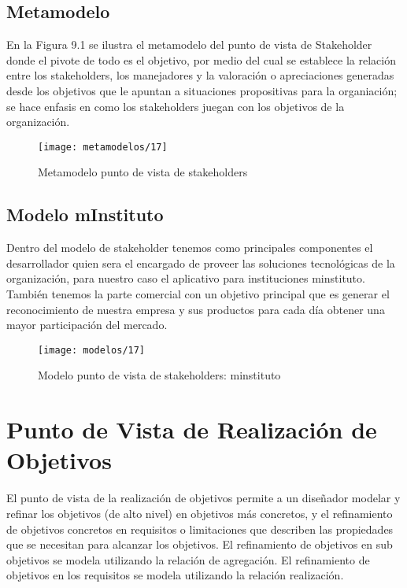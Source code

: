    \subsection{Metamodelo}
   En la Figura 9.1 se ilustra el metamodelo del punto de vista de Stakeholder donde el pivote de todo es el objetivo, por medio del cual se establece la relación entre los stakeholders, los manejadores y la valoración o apreciaciones generadas desde los objetivos que le apuntan a situaciones propositivas para la organiación; se hace enfasis en como los stakeholders juegan con los objetivos de la organización.
   
   \begin{figure}[H]
   	\centering
   	\texttt{[image: metamodelos/17]}
   	\captionsetup{width=.95\textwidth}
   	\caption{Metamodelo punto de vista de stakeholders}
   	\label{metamodelo17}
   \end{figure}
   
   \subsection{Modelo mInstituto}
   Dentro del modelo de stakeholder tenemos como principales componentes el desarrollador quien sera el encargado de proveer las soluciones tecnológicas de la organización, para nuestro caso el aplicativo para instituciones minstituto. También tenemos la parte comercial con un objetivo principal que es generar el reconocimiento de nuestra empresa y sus productos para cada día obtener una mayor participación del mercado.
   
   \begin{figure}[H]
   	\centering
   	\texttt{[image: modelos/17]}
   	\captionsetup{width=.95\textwidth}
   	\caption{Modelo punto de vista de stakeholders: minstituto}
   	\label{modelo17}
   \end{figure}
   
\section{Punto de Vista de Realización de Objetivos}
El punto de vista de la realización de objetivos permite a un diseñador modelar y refinar los objetivos (de alto nivel) en objetivos más concretos, y el refinamiento de objetivos concretos en requisitos o limitaciones que describen las propiedades que se necesitan para alcanzar los objetivos. El refinamiento de objetivos en sub objetivos se modela utilizando la relación de agregación. El refinamiento de objetivos en los requisitos se modela utilizando la relación realización.
      

